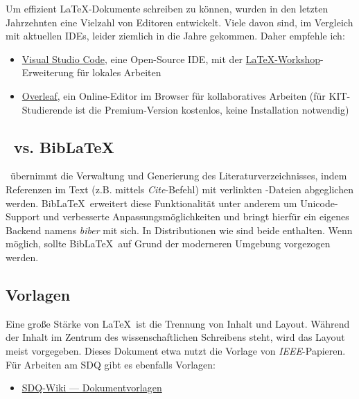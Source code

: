 Um effizient \LaTeX-Dokumente schreiben zu können, wurden in den letzten Jahrzehnten eine Vielzahl von Editoren entwickelt. Viele davon sind, im Vergleich mit aktuellen IDEs, leider ziemlich in die Jahre gekommen. Daher empfehle ich:

\smallskip
\begin{itemize}[label={\symbolTool}]
    \item \href{https://code.visualstudio.com/}{Visual Studio Code}, eine Open-Source IDE, mit der \href{https://marketplace.visualstudio.com/items?itemName=James-Yu.latex-workshop}{LaTeX-Workshop}-Erweiterung für lokales Arbeiten
    \item \href{http://overleaf.com/}{Overleaf}, ein Online-Editor im Browser für kollaboratives Arbeiten (für KIT-Studierende ist die Premium-Version kostenlos, keine Installation notwendig)
\end{itemize}
\smallskip

\subsection{\bibtex\ vs. Bib\LaTeX}%
\label{sec:Schreiben:Bibtex}

\bibtex\ übernimmt die Verwaltung und Generierung des Literaturverzeichnisses, indem Referenzen im Text (z.B. mittels \emph{Cite}-Befehl) mit verlinkten -Dateien abgeglichen werden.
Bib\LaTeX\ erweitert diese Funktionalität unter anderem um Unicode-Support und verbesserte Anpassungsmöglichkeiten und bringt hierfür ein eigenes Backend namens \emph{biber} mit sich.
In Distributionen wie  sind beide enthalten.
Wenn möglich, sollte Bib\LaTeX\ auf Grund der moderneren Umgebung vorgezogen werden.

\subsection{Vorlagen}%
\label{sec:Schreiben:Vorlagen}

Eine große Stärke von \LaTeX\ ist die Trennung von Inhalt und Layout.
Während der Inhalt im Zentrum des wissenschaftlichen Schreibens steht, wird das Layout meist vorgegeben.
Dieses Dokument etwa nutzt die Vorlage von \emph{IEEE}-Papieren. Für Arbeiten am SDQ gibt es ebenfalls Vorlagen:

\smallskip
\begin{itemize}[label={\symbolInfo}]
    \item \href{https://sdqweb.ipd.kit.edu/wiki/Dokumentvorlagen}{SDQ-Wiki --- Dokumentvorlagen}
\end{itemize}

